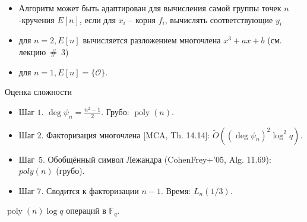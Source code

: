 \documentclass{beamer}
\begin{document}
\begin{frame}{}
    \begin{itemize}
        \item Алгоритм может быть адаптирован для вычисления самой группы точек $n$-кручения $E[ n]$, если для ${x_i}$ -- корня ${f_i}$, вычислять соответствующие ${y_i}$
        \item для $n = 2, E[n]$ вычисляется разложением многочлена ${x^3} + a x + b$ (см. лекцию~\#~3)
        \item для $n = 1, E[n] = \{ \mathcal{O} \}$. 
    \end{itemize}
\end{frame}

\begin{frame}{Оценка сложности}
    \begin{itemize}
        \item Шаг $1$. $\deg \psi_n = \frac{n^2 - 1}{2}$. Грубо: $\operatorname{poly}(n)$. \\
        \item Шаг $2$.
        Факторизация многочлена [MCA, Th. 14.14]:
        $\widetilde{O}((\deg{\psi_n})^2 \log^2{q})$.
        
        \item %
        Шаг~$5$. Обобщённый символ Лежандра (CohenFrey+'05, Alg. 11.69): $poly(n)$ (грубо).
        \item Шаг $7$. Сводится к факторизации $n-1$. Время: $L_n(1/3)$.
    \end{itemize}
    $\operatorname{poly}(n)\log{q}$ операций в $\mathbb{F}_q$.
\end{frame}

\end{document}

